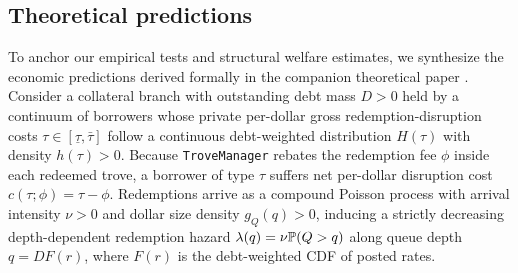 \subsection{Theoretical predictions}\label{subsec:theory}

To anchor our empirical tests and structural welfare estimates, we synthesize the economic predictions derived formally in the companion theoretical paper \citep{companion2026}. Consider a collateral branch with outstanding debt mass $D > 0$ held by a continuum of borrowers whose private per-dollar gross redemption-disruption costs $\tau \in [\underline{\tau}, \bar{\tau}]$ follow a continuous debt-weighted distribution $H(\tau)$ with density $h(\tau) > 0$. Because \texttt{TroveManager} rebates the redemption fee $\phi$ inside each redeemed trove, a borrower of type $\tau$ suffers net per-dollar disruption cost $c(\tau; \phi) = \tau - \phi$. Redemptions arrive as a compound Poisson process with arrival intensity $\nu > 0$ and dollar size density $g_Q(q) > 0$, inducing a strictly decreasing depth-dependent redemption hazard $\lambda(q) = \nu \mathbb{P}(Q > q)$ along queue depth $q = D F(r)$, where $F(r)$ is the debt-weighted CDF of posted rates.

